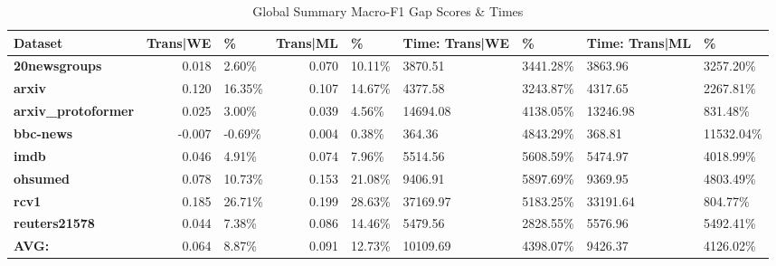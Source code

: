 \documentclass[final]{clv2025-revised}
\begin{document}
\begin{table}[h!]
\centering
\scriptsize
\caption{Global Summary Macro-F1 Gap Scores \& Times}
\label{tab:macro_f1_gap_summary}
\begin{tabular}{@{}p{1.3cm} r p{1cm} r p{1cm} p{1cm} p{1cm} p{1cm} p{1.1cm}@{}}
\toprule
\textbf{Dataset} & \textbf{Trans|WE} & \textbf{\%} & \textbf{Trans|ML} & \textbf{\%} & \textbf{Time: Trans|WE} & \textbf{\%} & \textbf{Time: Trans|ML} & \textbf{\%} \\
\midrule
\textbf{20newsgroups}      & 0.018 & 2.60\%  & 0.070 & 10.11\% & 3870.51 & 3441.28\% & 3863.96 & 3257.20\% \\
\textbf{arxiv}             & 0.120 & 16.35\% & 0.107 & 14.67\% & 4377.58 & 3243.87\% & 4317.65 & 2267.81\% \\
\textbf{arxiv\_protoformer}& 0.025 & 3.00\%  & 0.039 & 4.56\%  & 14694.08 & 4138.05\% & 13246.98 & 831.48\% \\
\textbf{bbc-news}          & -0.007 & -0.69\% & 0.004 & 0.38\% & 364.36 & 4843.29\% & 368.81 & 11532.04\% \\
\textbf{imdb}              & 0.046 & 4.91\%  & 0.074 & 7.96\%  & 5514.56 & 5608.59\% & 5474.97 & 4018.99\% \\
\textbf{ohsumed}           & 0.078 & 10.73\% & 0.153 & 21.08\% & 9406.91 & 5897.69\% & 9369.95 & 4803.49\% \\
\textbf{rcv1}              & 0.185 & 26.71\% & 0.199 & 28.63\% & 37169.97 & 5183.25\% & 33191.64 & 804.77\% \\
\textbf{reuters21578}      & 0.044 & 7.38\%  & 0.086 & 14.46\% & 5479.56 & 2828.55\% & 5576.96 & 5492.41\% \\
\midrule
\textbf{AVG:}              & 0.064 & 8.87\%  & 0.091 & 12.73\% & 10109.69 & 4398.07\% & 9426.37 & 4126.02\% \\
\bottomrule
\end{tabular}
\end{table}
\end{document}
